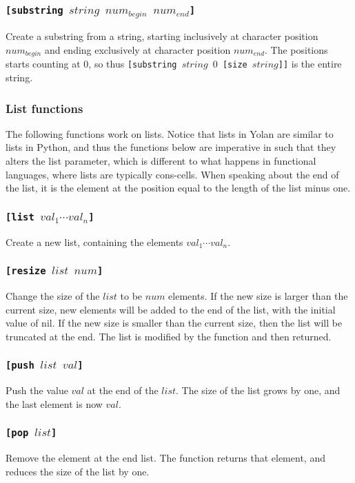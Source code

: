 \documentclass[11pt]{report}
\begin{document}
\subsubsection*{\tt{[substring }$string$ $num_{begin}$ $num_{end}$\tt{]}}
Create a substring from a string, starting inclusively at character position $num_{begin}$ and ending exclusively at character position $num_{end}$. The positions starts counting at $0$, so thus {\tt{[substring }$string$ $0$ \tt{[size }$string$\tt{]]}} is the entire string.

\subsubsection{List functions}
The following functions work on lists. Notice that lists in Yolan are similar to lists in Python, and thus the functions below are imperative in such that they alters the list parameter, which is different to what happens in functional languages, where lists are typically cons-cells. When speaking about the end of the list, it is the element at the position equal to the length of the list minus one.

\subsubsection*{\tt{[list }$val_1\cdots val_n$\tt{]}}
Create a new list, containing the elements $val_1\cdots val_n$.

\subsubsection*{\tt{[resize }$list$ $num$\tt{]}}
Change the size of the $list$ to be $num$ elements. 
If the new size is larger than the current size, new elements will be added to the end of the list, with the initial value of nil. If the new size is smaller than the current size, then the list will be truncated at the end. The list is modified by the function and then returned.

\subsubsection*{\tt{[push }$list$ $val$\tt{]}}
Push the value $val$ at the end of the $list$. The size of the list grows by one, and the last element is now $val$.

\subsubsection*{\tt{[pop }$list$\tt{]}}
Remove the element at the end list. The function returns that element, and reduces the size of the list by one.
\end{document}
